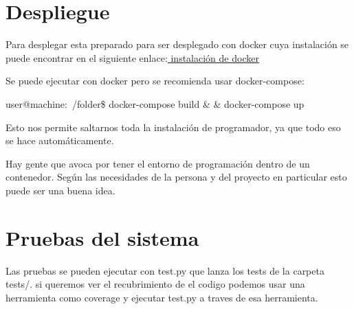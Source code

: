\section{Despliegue}

Para desplegar esta preparado para ser desplegado con docker cuya instalación se puede encontrar en el siguiente enlace:\href{https://docs.docker.com/engine/installation}{ instalación de docker} 
	

Se puede ejecutar con docker pero se recomienda usar docker-compose:

user@machine:~/folder\$ docker-compose build \& \& docker-compose up 

Esto nos permite saltarnos toda la instalación de programador, ya que todo eso se hace automáticamente.

Hay gente que avoca por tener el entorno de programación dentro de un contenedor. Según las necesidades de la persona y del proyecto en particular esto puede ser una buena idea. 


\section{Pruebas del sistema}

Las pruebas se pueden ejecutar con test.py que lanza los tests de la carpeta tests/. si queremos ver el recubrimiento de el codigo podemos usar una herramienta como coverage y ejecutar test.py a traves de esa herramienta.  



